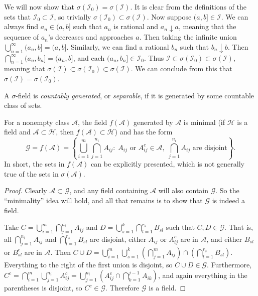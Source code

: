 \documentclass[11pt,fleqn]{book} %
\begin{document}
We will now show that $\sigma(\mathcal{I}_0) = \sigma(\mathcal{I})$. It is clear from the definitions of the sets that $\mathcal{I}_0 \subset \mathcal{I}$, so trivially $\sigma(\mathcal{I}_0) \subset \sigma(\mathcal{I})$. Now suppose $(a,b] \in \mathcal{I}$. We can always find $a_n \in (a,b]$ such that $a_n$ is rational and $a_n \downarrow a$, meaning that the sequence of $a_n$'s decreases and approaches $a$. Then taking the infinite union $\bigcup_{n=1}^\infty (a_n,b] = (a,b]$. Similarly, we can find a rational $b_n$ such that $b_n \downarrow b$. Then $\bigcap_{n=1}^\infty (a_n,b_n] = (a_n,b]$, and each $(a_n,b_n] \in \mathcal{I}_0$. Thus $\mathcal{I} \subset \sigma(\mathcal{I}_0) \subset \sigma(\mathcal{I})$, meaning that $\sigma(\mathcal{I}) \subset \sigma(\mathcal{I}_0) \subset \sigma(\mathcal{I})$. We can conclude from this that $\sigma(\mathcal{I}) = \sigma(\mathcal{I}_0)$.

\begin{remark}\label{rem:1.2}
	A $\sigma$-field is \emph{countably generated}, or \emph{separable}, if it is generated by some countable class of sets.
\end{remark}

\begin{theorem} \label{thm:1.1}
	For a nonempty class $\mathcal{A}$, the field $f(\mathcal{A})$ generated by $\mathcal{A}$ is minimal (if $\mathcal{H}$ is a field and $\mathcal{A} \subset \mathcal{H}$, then $f(\mathcal{A}) \subset \mathcal{H}$) and has the form
	\[
		\mathcal{G} = f(\mathcal{A}) = \left\{\bigcup_{i=1}^m \bigcap_{j=1}^{n_i} A_{ij}:\;A_{ij} \textrm{ or } A_{ij}^c \in \mathcal{A},\;\bigcap_{j=1}^{n_i} A_{ij} \textrm{ are disjoint}\right\}.
	\]
	In short, the sets in $f(\mathcal{A})$ can be explicitly presented, which is not generally true of the sets in $\sigma(\mathcal{A})$.
\end{theorem}

\begin{proof}
	Clearly $\mathcal{A} \subset \mathcal{G}$, and any field containing $\mathcal{A}$ will also contain $\mathcal{G}$. So the ``minimality'' idea will hold, and all that remains is to show that $\mathcal{G}$ is indeed a field.

	Take $C = \bigcup_{i=1}^m \bigcap_{j=1}^{n_i} A_{ij}$ and $D = \bigcup_{s=1}^k \bigcap_{l=1}^{r_s} B_{sl}$ such that $C,D \in \mathcal{G}$. That is, all $\bigcap_{j=1}^{n_i} A_{ij}$ and $\bigcap_{l=1}^{r_s} B_{sl}$ are disjoint, either $A_{ij}$ or $A_{ij}^c$ are in $\mathcal{A}$, and either $B_{sl}$ or $B_{sl}^c$ are in $\mathcal{A}$. Then $C \cup D = \bigcup_{i=1}^m \bigcup_{s=1}^k \left( \bigcap_{j=1}^m A_{ij} \right) \cap \left( \bigcap_{l=1}^{r_s} B_{sl} \right)$. Everything to the right of the first union is disjoint, so $C \cup D \in \mathcal{G}$. Furthermore, $C^c = \bigcap_{i=1}^m \bigcup_{j=1}^{n_i} A_{ij}^c = \bigcup_{j=1}^{n_i} \left( A_{ij}^c \cap \bigcap_{k=1}^{j-1} A_{ik} \right)$, and again everything in the parentheses is disjoint, so $C^c \in \mathcal{G}$. Therefore $\mathcal{G}$ is a field.
\end{proof}
\end{document}
